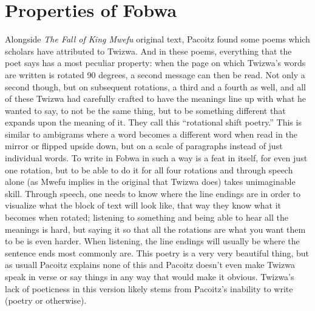 \section{Properties of Fobwa}
\label{rotshift}
Alongside \emph{The Fall of King Mwefu} original text, Pacoitz found some poems which scholars have attributed to Twizwa. And in these poems, everything that the poet says has a most peculiar property: when the page on which Twizwa's words are written is rotated 90 degrees, a second message can then be read. Not only a second though, but on subsequent rotations, a third and a fourth as well, and all of these Twizwa had carefully crafted to have the meanings line up with what he wanted to say, to not be the same thing, but to be something different that expands upon the meaning of it. They call this ``rotational shift poetry.'' This is similar to ambigrams where a word becomes a different word when read in the mirror or flipped upside down, but on a scale of paragraphs instead of just individual words. To write in Fo\-bwa in such a way is a feat in itself, for even just one rotation, but to be able to do it for all four rotations and through speech alone (as Mwefu implies in the original that Twizwa does) takes unimaginable skill. Through speech, one needs to know where the line endings are in order to visualize what the block of text will look like, that way they know what it becomes when rotated; listening to something and being able to hear all the meanings is hard, but saying it so that all the rotations are what you want them to be is even harder. When listening, the line endings will usually be where the sentence ends most commonly are. This poetry is a very very beautiful thing, but as usuall Pacoitz explains none of this and Pacoitz doesn't even make Twizwa speak in verse or say things in any way that would make it obvious. Twizwa's lack of poeticness in this version likely stems from Pacoitz's inability to write (poetry or otherwise).

